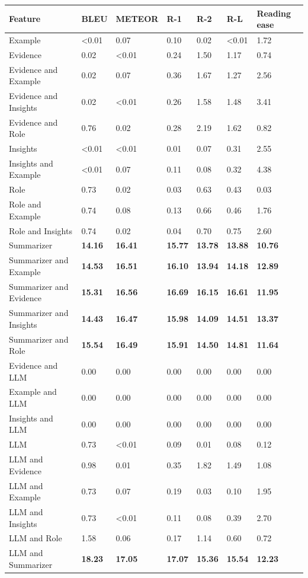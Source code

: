 \begin{tabular}{|l|l|l|l|l|l|l|}
\hline
\textbf{Feature} & BLEU & METEOR & R-1 & R-2 & R-L & Reading ease \\
 \hline
 Example & \textless{}0.01 & 0.07 & 0.10 & 0.02 & \textless{}0.01 & 1.72 \\
 \hline
 Evidence & 0.02 & \textless{}0.01 & 0.24 & 1.50 & 1.17 & 0.74 \\
 \hline
 Evidence and Example & 0.02 & 0.07 & 0.36 & 1.67 & 1.27 & 2.56 \\
 \hline
 Evidence and Insights & 0.02 & \textless{}0.01 & 0.26 & 1.58 & 1.48 & 3.41 \\
 \hline
 Evidence and Role & 0.76 & 0.02 & 0.28 & 2.19 & 1.62 & 0.82 \\
 \hline
 Insights & \textless{}0.01 & \textless{}0.01 & 0.01 & 0.07 & 0.31 & 2.55 \\
 \hline
 Insights and Example & \textless{}0.01 & 0.07 & 0.11 & 0.08 & 0.32 & 4.38 \\
 \hline
 Role & 0.73 & 0.02 & 0.03 & 0.63 & 0.43 & 0.03 \\
 \hline
 Role and Example & 0.74 & 0.08 & 0.13 & 0.66 & 0.46 & 1.76 \\
 \hline
 Role and Insights & 0.74 & 0.02 & 0.04 & 0.70 & 0.75 & 2.60 \\
 \hline
 Summarizer & \textbf{14.16} & \textbf{16.41} & \textbf{15.77} & \textbf{13.78} & \textbf{13.88} & \textbf{10.76} \\
 \hline
 Summarizer and Example & \textbf{14.53} & \textbf{16.51} & \textbf{16.10} & \textbf{13.94} & \textbf{14.18} & \textbf{12.89} \\
 \hline
 Summarizer and Evidence & \textbf{15.31} & \textbf{16.56} & \textbf{16.69} & \textbf{16.15} & \textbf{16.61} & \textbf{11.95} \\
 \hline
 Summarizer and Insights & \textbf{14.43} & \textbf{16.47} & \textbf{15.98} & \textbf{14.09} & \textbf{14.51} & \textbf{13.37} \\
 \hline
 Summarizer and Role & \textbf{15.54} & \textbf{16.49} & \textbf{15.91} & \textbf{14.50} & \textbf{14.81} & \textbf{11.64} \\
 \hline
 Evidence and LLM & 0.00 & 0.00 & 0.00 & 0.00 & 0.00 & 0.00 \\
 \hline
 Example and LLM & 0.00 & 0.00 & 0.00 & 0.00 & 0.00 & 0.00 \\
 \hline
 Insights and LLM & 0.00 & 0.00 & 0.00 & 0.00 & 0.00 & 0.00 \\
 \hline
 LLM & 0.73 & \textless{}0.01 & 0.09 & 0.01 & 0.08 & 0.12 \\
 \hline
 LLM and Evidence & 0.98 & 0.01 & 0.35 & 1.82 & 1.49 & 1.08 \\
 \hline
 LLM and Example & 0.73 & 0.07 & 0.19 & 0.03 & 0.10 & 1.95 \\
 \hline
 LLM and Insights & 0.73 & \textless{}0.01 & 0.11 & 0.08 & 0.39 & 2.70 \\
 \hline
 LLM and Role & 1.58 & 0.06 & 0.17 & 1.14 & 0.60 & 0.72 \\
 \hline
 LLM and Summarizer & \textbf{18.23} & \textbf{17.05} & \textbf{17.07} & \textbf{15.36} & \textbf{15.54} & \textbf{12.23} \\
\hline
\end{tabular}
